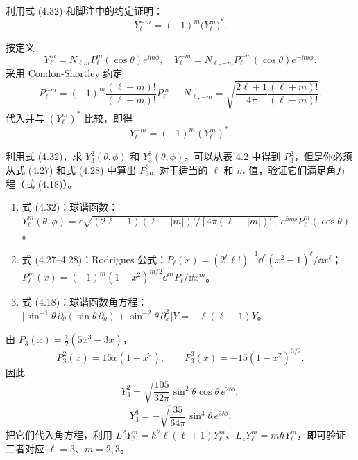 \begin{question}
利用式 (4.32) 和脚注中的约定证明：
\[
Y_\ell^{-m}=(-1)^m\bigl(Y_\ell^m\bigr)^* .
\]

\par\smallskip
{}

\end{question}
\begin{solution}

按定义
\[
Y_\ell^m=N_{\ell m}P_\ell^m(\cos\theta)e^{\ii m\phi},
\quad
Y_\ell^{-m}=N_{\ell,-m}P_\ell^{-m}(\cos\theta)e^{-\ii m\phi}.
\]
采用 Condon-Shortley 约定
\[
P_\ell^{-m}=(-1)^m\frac{(\ell-m)!}{(\ell+m)!}P_\ell^m,
\quad
N_{\ell,-m}=\sqrt{\frac{2\ell+1}{4\pi}\frac{(\ell+m)!}{(\ell-m)!}}.
\]
代入并与 $(Y_\ell^m)^*$ 比较，即得
\[
Y_\ell^{-m}=(-1)^m(Y_\ell^m)^*.
\]

\end{solution}

\begin{question}
利用式 (4.32)，求 $Y_3^2(\theta,\phi)$ 和 $Y_3^3(\theta,\phi)$。可以从表 4.2 中得到 $P_3^2$，但是你必须从式 (4.27) 和式 (4.28) 中算出 $P_3^3$。对于适当的 $\ell$ 和 $m$ 值，验证它们满足角方程（式 (4.18)）。

\par\smallskip
{}
\begin{enumerate}[leftmargin=2.2em,itemsep=0.12em,topsep=0.12em,parsep=0pt]
\item 式 (4.32)：球谐函数：$Y_\ell^m(\theta,\phi)=\epsilon\sqrt{(2\ell+1)(\ell-|m|)!/[4\pi(\ell+|m|)!]}\,e^{\ii m\phi}P_\ell^m(\cos\theta)$。
\item 式 (4.27--4.28)：Rodrigues 公式：$P_\ell(x)=(2^\ell\ell!)^{-1}\dd^\ell(x^2-1)^\ell/\dd x^\ell$；$P_\ell^m(x)=(-1)^m(1-x^2)^{m/2}\dd^mP_\ell/\dd x^m$。
\item 式 (4.18)：球谐函数角方程：$\bigl[\sin^{-1}\theta\,\partial_\theta(\sin\theta\,\partial_\theta)+\sin^{-2}\theta\,\partial_\phi^2\bigr]Y=-\ell(\ell+1)Y$。
\end{enumerate}

\end{question}
\begin{solution}

由 $P_3(x)=\tfrac12(5x^3-3x)$，
\[
P_3^2(x)=15x(1-x^2),\qquad P_3^3(x)=-15(1-x^2)^{3/2}.
\]
因此
\[
Y_3^2=\sqrt{\frac{105}{32\pi}}\sin^2\theta\cos\theta\,e^{2\ii\phi},
\]
\[
Y_3^3=-\sqrt{\frac{35}{64\pi}}\sin^3\theta\,e^{3\ii\phi}.
\]
把它们代入角方程，利用 $L^2Y_\ell^m=\hbar^2\ell(\ell+1)Y_\ell^m$、$L_zY_\ell^m=m\hbar Y_\ell^m$，即可验证二者对应 $\ell=3$、$m=2,3$。

\end{solution}

